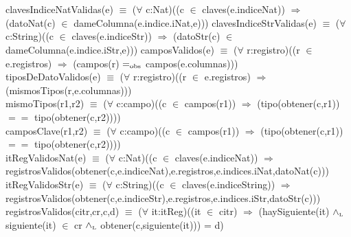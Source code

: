 ~

\mbox{}
\\

clavesIndiceNatValidas(e) $\equiv$ ($\forall$ c:Nat)((c $\in$ claves(e.indiceNat)) $\Rightarrow$ (datoNat(c) $\in$ dameColumna(e.indice.iNat,e)))
clavesIndiceStrValidas(e) $\equiv$ ($\forall$ c:String)((c $\in$ claves(e.indiceStr)) $\Rightarrow$ (datoStr(c) $\in$ dameColumna(e.indice.iStr,e)))
camposValidos(e) $\equiv$ ($\forall$ r:registro)((r $\in$ e.registros) $\Rightarrow$ (campos(r) $=_{\mathrm{obs}}$ campos(e.columnas))) \\
tiposDeDatoValidos(e) $\equiv$ ($\forall$ r:registro)((r $\in$ e.registros) $\Rightarrow$ (mismosTipos(r,e.columnas))) \\
mismoTipos(r1,r2) $\equiv$ ($\forall$ c:campo)((c $\in$ campos(r1)) $\Rightarrow$ (tipo(obtener(c,r1)) $==$ tipo(obtener(c,r2)))) \\
camposClave(r1,r2) $\equiv$ ($\forall$ c:campo)((c $\in$ campos(r1)) $\Rightarrow$ (tipo(obtener(c,r1)) $==$ tipo(obtener(c,r2)))) \\
itRegValidosNat(e) $\equiv$ ($\forall$ c:Nat)((c $\in$ claves(e.indiceNat)) $\Rightarrow$ \\ 
registrosValidos(obtener(c,e.indiceNat),e.registros,e.indices.iNat,datoNat(c))) \\
itRegValidosStr(e) $\equiv$ ($\forall$ c:String)((c $\in$ claves(e.indiceString)) $\Rightarrow$ \\
registrosValidos(obtener(c,e.indiceStr),e.registros,e.indices.iStr,datoStr(c))) \\
registrosValidos(citr,cr,c,d) $\equiv$ ($\forall$ it:itReg)((it $\in$ citr) $\Rightarrow$ (haySiguiente(it) $\land_{\mathrm{\scriptscriptstyle{L}}}$ siguiente(it) $\in$ cr $\land_{\mathrm{\scriptscriptstyle{L}}}$ obtener(c,siguiente(it))) = d) \\


